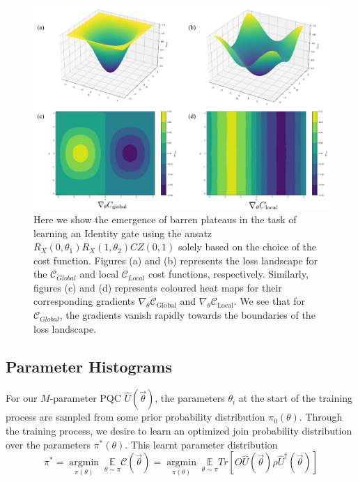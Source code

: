 \begin{figure}[ht]
    \centering
    \includegraphics[width=\linewidth]{figures/qleet/barren-plateau.pdf}
    \caption[Presence of barren plateaus in parameterized quantum circuits]{Here we show the emergence of barren plateaus in the task of learning an Identity gate using the ansatz $R_X(0,\theta_1)R_X(1, \theta_2)CZ(0, 1)$ solely based on the choice of the cost function. Figures (a) and (b) represents the loss landscape for the $\mathcal{C}_{Global}$ and local $\mathcal{C}_{Local}$ cost functions, respectively. Similarly, figures (c) and (d) represents coloured heat maps for their  corresponding gradients $\nabla_{\theta}\mathcal{C}_{\text{Global}}$ and $\nabla_{\theta}\mathcal{C}_{\text{Local}}$. We see that for $\mathcal{C}_{Global}$, the gradients vanish rapidly towards the boundaries of the loss landscape.}
    \label{fig:barren-plateau}
\end{figure}


\subsection{Parameter Histograms}

For our $M$-parameter PQC $\hat{U}(\vec{\theta})$, the parameters $\theta_i$ at the start of the training process are sampled from some prior probability distribution $\pi_0(\theta)$. Through the training process, we desire to learn an optimized join probability distribution over the parameters $\pi^*(\theta)$. This learnt parameter distribution
\begin{equation}
    \pi^* = \underset{\pi(\theta)}{\operatorname{argmin}} \; \underset{\theta \sim \pi}{\mathbb{E}} \mathcal{C}(\vec{\theta}) = \underset{\pi(\theta)}{\operatorname{argmin}} \; \underset{\theta \sim \pi}{\mathbb{E}} Tr[O \hat{U}(\vec{\theta}) \rho \hat{U}^\dagger(\vec{\theta})]
\end{equation}

